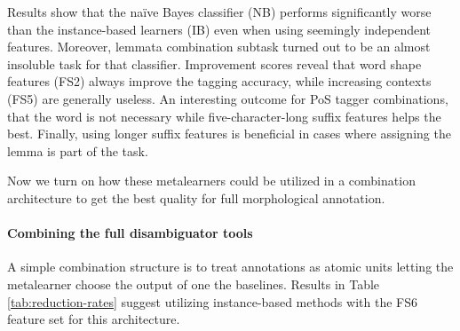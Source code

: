 Results show that the naïve Bayes classifier (NB) performs significantly worse than the instance-based learners (IB) even when using seemingly independent features. Moreover, lemmata combination subtask turned out to be an almost insoluble task for that classifier. 
Improvement scores reveal that word shape features (FS2) always improve the tagging accuracy, while increasing contexts (FS5) are generally useless. An interesting outcome for PoS tagger combinations, that the word is not necessary while five-character-long suffix features helps the best. 
Finally, using longer suffix features is beneficial in cases where assigning the lemma is part of the task. 

Now we turn on how these metalearners could be utilized in a combination architecture to get the best quality for full morphological annotation.

\paragraph{Combining the full disambiguator tools}

A simple combination structure is to treat annotations as atomic units letting the metalearner choose the output of one the baselines. Results in Table \ref{tab:reduction-rates} suggest utilizing instance-based methods with the FS6 feature set for this architecture. 




